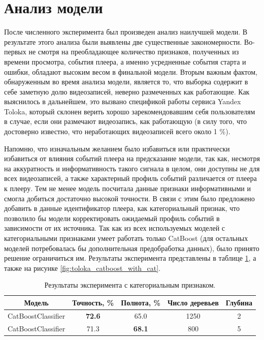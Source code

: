 \section{Анализ модели}

После численного эксперимента был произведен анализ наилучшей модели. В результате этого анализа были выявлены две существенные закономерности. Во-первых не смотря на преобладающее количество признаков, полученных из времени просмотра, события плеера, а именно усредненные события старта и ошибки, обладают высоким весом в финальной модели. Вторым важным фактом, обнаруженным во время анализа модели, является то, что выборка содержит в себе заметную долю видеозаписей, неверно размеченных как работающие. Как выяснилось в дальнейшем, это вызвано спецификой работы сервиса Yandex Toloka, который склонен верить хорошо зарекомендовавшим себя пользователям в случае, если они размечают видеозапись, как работающую (в силу того, что достоверно известно, что неработающих видеозаписей всего около 1 \%).

Напомню, что изначальным желанием было избавиться или практически избавиться от влияния событий плеера на предсказание модели, так как, несмотря на аккуратность и информативность такого сигнала в целом, они доступны не для всех видеозаписей, а также характерный профиль событий различается от плеера к плееру. Тем не менее модель посчитала данные признаки информативными и смогла добиться достаточно высокой точности. В связи с этим было предложено добавить в данные идентификатор плеера, как категориальный признак, что позволило бы модели корректировать ожидаемый профиль событий в зависимости от их источника. Так как из всех используемых моделей с категориальными признаками умеет работать только CatBoost (для остальных моделей потребовалась бы дополнительная предобработка данных), было принято решение ограничиться им. Результаты эксперимента представлены в таблице \ref{tab:toloka_catboost_with_cat}, а также на рисунке \ref{fig:toloka_catboost_with_cat}.

\begin{table}[h]
    \centering
    \begin{tabular}{|c|c|c|c|c|}
        \hline
        Модель & Точность, \% & Полнота, \% & Число деревьев & Глубина \\
        \hline
        CatBoostClassifier & \textbf{72.6} & 65.0 & 1250 & 2 \\
        \hline
        CatBoostClassifier & 71.3 & \textbf{68.1} & 800 & 5 \\
        \hline
    \end{tabular}
    \caption{Результаты эксперимента с категориальным признаком.}
    \label{tab:toloka_catboost_with_cat}
\end{table}


